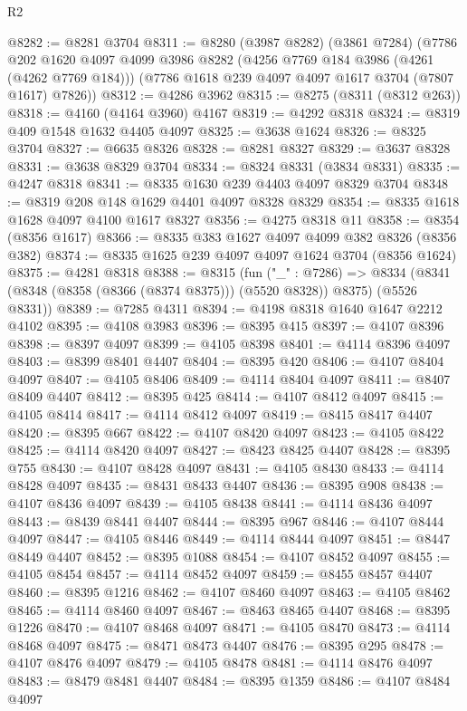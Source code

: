 \begin{lexlean}{R2}
\begin{coremodule}
@8282 := @8281 @3704
@8311 := @8280
    (@3987 @8282)
    (@3861 @7284)
    (@7786
      @202
      @1620
      @4097
      @4099
      @3986
      @8282
      (@4256 @7769 @184 @3986 (@4261 (@4262 @7769 @184)))
      (@7786 @1618 @239 @4097 @4097 @1617 @3704 (@7807 @1617) @7826))
@8312 := @4286 @3962
@8315 := @8275 (@8311 (@8312 @263))
@8318 := @4160 (@4164 @3960) @4167
@8319 := @4292 @8318
@8324 := @8319 @409 @1548 @1632 @4405 @4097
@8325 := @3638 @1624
@8326 := @8325 @3704
@8327 := @6635 @8326
@8328 := @8281 @8327
@8329 := @3637 @8328
@8331 := @3638 @8329 @3704
@8334 := @8324 @8331 (@3834 @8331)
@8335 := @4247 @8318
@8341 := @8335 @1630 @239 @4403 @4097 @8329 @3704
@8348 := @8319 @208 @148 @1629 @4401 @4097 @8328 @8329
@8354 := @8335 @1618 @1628 @4097 @4100 @1617 @8327
@8356 := @4275 @8318 @11
@8358 := @8354 (@8356 @1617)
@8366 := @8335 @383 @1627 @4097 @4099 @382 @8326 (@8356 @382)
@8374 := @8335 @1625 @239 @4097 @4097 @1624 @3704 (@8356 @1624)
@8375 := @4281 @8318
@8388 := @8315
    (fun ("_" : @7286) =>
    @8334 (@8341 (@8348 (@8358 (@8366 (@8374 @8375))) (@5520 @8328)) @8375) (@5526 @8331))
@8389 := @7285 @4311
@8394 := @4198 @8318 @1640 @1647 @2212 @4102
@8395 := @4108 @3983
@8396 := @8395 @415
@8397 := @4107 @8396
@8398 := @8397 @4097
@8399 := @4105 @8398
@8401 := @4114 @8396 @4097
@8403 := @8399 @8401 @4407
@8404 := @8395 @420
@8406 := @4107 @8404 @4097
@8407 := @4105 @8406
@8409 := @4114 @8404 @4097
@8411 := @8407 @8409 @4407
@8412 := @8395 @425
@8414 := @4107 @8412 @4097
@8415 := @4105 @8414
@8417 := @4114 @8412 @4097
@8419 := @8415 @8417 @4407
@8420 := @8395 @667
@8422 := @4107 @8420 @4097
@8423 := @4105 @8422
@8425 := @4114 @8420 @4097
@8427 := @8423 @8425 @4407
@8428 := @8395 @755
@8430 := @4107 @8428 @4097
@8431 := @4105 @8430
@8433 := @4114 @8428 @4097
@8435 := @8431 @8433 @4407
@8436 := @8395 @908
@8438 := @4107 @8436 @4097
@8439 := @4105 @8438
@8441 := @4114 @8436 @4097
@8443 := @8439 @8441 @4407
@8444 := @8395 @967
@8446 := @4107 @8444 @4097
@8447 := @4105 @8446
@8449 := @4114 @8444 @4097
@8451 := @8447 @8449 @4407
@8452 := @8395 @1088
@8454 := @4107 @8452 @4097
@8455 := @4105 @8454
@8457 := @4114 @8452 @4097
@8459 := @8455 @8457 @4407
@8460 := @8395 @1216
@8462 := @4107 @8460 @4097
@8463 := @4105 @8462
@8465 := @4114 @8460 @4097
@8467 := @8463 @8465 @4407
@8468 := @8395 @1226
@8470 := @4107 @8468 @4097
@8471 := @4105 @8470
@8473 := @4114 @8468 @4097
@8475 := @8471 @8473 @4407
@8476 := @8395 @295
@8478 := @4107 @8476 @4097
@8479 := @4105 @8478
@8481 := @4114 @8476 @4097
@8483 := @8479 @8481 @4407
@8484 := @8395 @1359
@8486 := @4107 @8484 @4097

\end{coremodule}
\end{lexlean}
